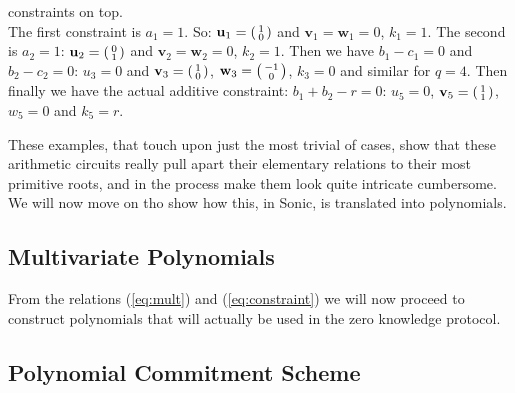 \documentclass[11pt,oneside]{article}
\theoremstyle{definition}
\theoremstyle{remark}
\numberwithin{equation}{section}
\begin{document}
\begin{itemize}
constraints on top.\\
The first constraint is $a_1=1$. So: $\mathbf{u}_1=\begin{psmallmatrix} 1\\0
\end{psmallmatrix} $ and $\mathbf{v}_1=\mathbf{w}_1=0$, $k_1=1$. The second is $a_2=1$:
$\mathbf{u}_2=\begin{psmallmatrix} 0\\1
\end{psmallmatrix} $ and $\mathbf{v}_2=\mathbf{w}_2=0$, $k_2=1$. Then we have
$b_1-c_1=0$ and $b_2-c_2=0$: $u_3=0$ and $\mathbf{v}_3=\begin{psmallmatrix} 1\\0
\end{psmallmatrix} $, $\mathbf{w}_3=\begin{psmallmatrix} -1\\0
\end{psmallmatrix} $, $k_3=0$ and similar for $q=4$. Then finally we have the
actual additive constraint: $b_1+b_2-r=0$: $u_5=0$,
$\mathbf{v}_5=\begin{psmallmatrix} 1\\1
\end{psmallmatrix} $, $w_5=0$ and $k_5=r$.     
\end{itemize}
\newpage
These examples, that touch upon just the most trivial of cases, show that these
arithmetic circuits really pull apart their elementary relations to their most
primitive roots, and in the process make them look quite intricate cumbersome.\\
We will now move on tho show how this, in Sonic, is translated into polynomials.

\subsection{Multivariate Polynomials}

From the relations (\ref{eq:mult}) and (\ref{eq:constraint}) we will now proceed
to construct polynomials that will actually be used in the zero knowledge
protocol. 

\subsection{Polynomial Commitment Scheme}\label{subsec:poly}
	
\end{document}
